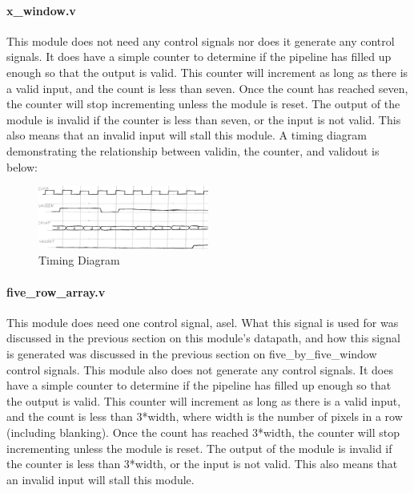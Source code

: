 \paragraph{x\_window.v}
This module does not need any control signals nor does it generate any control 
signals. It does have a simple counter to determine if the pipeline has filled 
up enough so that the output is valid. This counter will increment as long as 
there is a valid input, and the count is less than seven. Once the count has 
reached seven, the counter will stop incrementing unless the module is reset. 
The output of the module is invalid if the counter is less than seven, or the 
input is not valid. This also means that an invalid input will stall this 
module. A timing diagram demonstrating the relationship between validin, the 
counter, and validout is below:

\begin{figure}
    \includegraphics[width=0.5\textwidth]{processed_image_pngs/timing_1.png}
    \caption{Timing Diagram}
    \label{fig:timing_1}
\end{figure}



\paragraph{five\_row\_array.v}
This module does need one control signal, asel. What this signal is used for was discussed in the previous section on this module's datapath, and how this signal is generated was discussed in the previous section on five\_by\_five\_window control signals. This module also does not generate any control signals. It does have a simple counter to determine if the pipeline has filled up enough so that the output is valid. This counter will increment as long as there is a valid input, and the count is less than 3*width, where width is the number of pixels in a row (including blanking). Once the count has reached 3*width, the counter will stop incrementing unless the module is reset. The output of the module is invalid if the counter is less than 3*width, or the input is not valid. This also means that an invalid input will stall this module.


